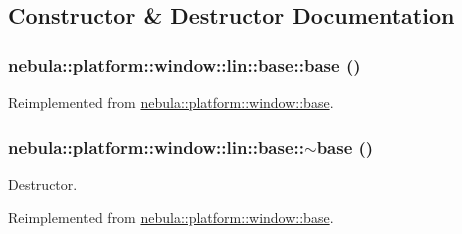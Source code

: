 \subsection{Constructor \& Destructor Documentation}
\hypertarget{classnebula_1_1platform_1_1window_1_1lin_1_1base_a9441236d249988aee2ae24c70acc2d25}{
\subsubsection[{base}]{\setlength{\rightskip}{0pt plus 5cm}nebula::platform::window::lin::base::base ()}}
\label{classnebula_1_1platform_1_1window_1_1lin_1_1base_a9441236d249988aee2ae24c70acc2d25}


Reimplemented from \hyperlink{classnebula_1_1platform_1_1window_1_1base_afcbf9d5d846a10cce5ebf100e1abbca1}{nebula::platform::window::base}.\hypertarget{classnebula_1_1platform_1_1window_1_1lin_1_1base_aee19a7238b38b14e69a87d7e9c95aa13}{
\subsubsection[{$\sim$base}]{\setlength{\rightskip}{0pt plus 5cm}nebula::platform::window::lin::base::$\sim$base ()}}
\label{classnebula_1_1platform_1_1window_1_1lin_1_1base_aee19a7238b38b14e69a87d7e9c95aa13}


Destructor. 

Reimplemented from \hyperlink{classnebula_1_1platform_1_1window_1_1base_a40f1250dd3383ad57200c65e969d3e5b}{nebula::platform::window::base}.

